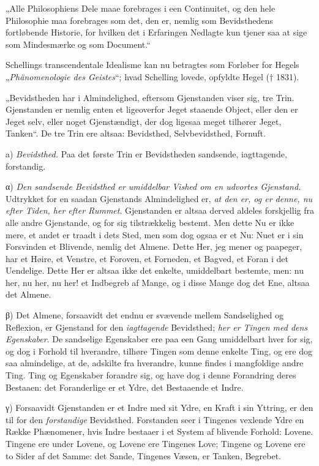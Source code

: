 \documentclass[12pt]{book}
\newcommand{\opage}[1]{\marginnote{\footnotesize\textit{[#1]}}}
\begin{document}
„Alle Philosophiens Dele maae forebrages i een Continuitet, og den hele Philosophie
maa forebrages som det, den er, nemlig som Bevidsthedens fortløbende Historie, for
hvilken det i Erfaringen Nedlagte kun tjener saa at sige som Mindesmærke og som
Document.“

Schellings transcendentale Idealisme kan nu betragtes som Forløber for Hegels
„\textit{Phänomenologie des Geistes}“; hvad Schelling lovede, opfyldte Hegel
(† 1831).

„Bevidstheden har i Almindelighed, eftersom Gjenstanden viser sig, tre Trin.
Gjenstanden er nemlig enten et ligeoverfor Jeget staaende Object, eller den er Jeget
selv, eller noget Gjenstændigt, der dog ligesaa meget tilhører Jeget, Tanken“. De
tre Trin ere altsaa: Bevidsthed, Selvbevidsthed, Fornuft.

a) \emph{Bevidsthed.} Paa det første Trin er Bevidstheden sandsende, iagttagende,
forstandig.

α) \emph{Den sandsende Bevidsthed er umiddelbar Vished om en udvortes Gjenstand.}
Udtrykket for en saadan Gjenstands Almindelighed er, \emph{at den er, og er denne,
nu efter Tiden, her efter Rummet}. Gjenstanden er altsaa derved aldeles forskjellig
fra alle andre Gjenstande, og for sig tilstrækkelig bestemt. Men dette Nu er ikke
mere, et andet er traadt i dets Sted, men som dog ogsaa er et Nu: Nuet
\opage{38} er i sin Forsvinden et Blivende, nemlig det Almene. Dette Her, jeg mener og
paapeger, har et Høire, et Venstre, et Foroven, et Forneden, et Bagved, et Foran i
det Uendelige. Dette Her er altsaa ikke det enkelte, umiddelbart bestemte, men: nu
her, nu her, nu her! et Indbegreb af Mange, og i disse Mange dog det Ene, altsaa det
Almene.

β) Det Almene, forsaavidt det endnu er svævende mellem Sandselighed og Reflexion, er
Gjenstand for den \emph{iagttagende} Bevidsthed; \emph{her er Tingen med dens
Egenskaber}. De sandselige Egenskaber ere paa een Gang umiddelbart hver for sig, og
dog i Forhold til hverandre, tilhøre Tingen som denne enkelte Ting, og ere dog saa
almindelige, at de, adskilte fra hverandre, kunne findes i mangfoldige andre Ting.
Ting og Egenskaber forandre sig, og have dog i denne Forandring deres Bestaaen: det
Foranderlige er et Ydre, det Bestaaende et Indre.

γ) Forsaavidt Gjenstanden er et Indre med sit Ydre, en Kraft i sin Yttring, er den
til for den \emph{forstandige} Bevidsthed. Forstanden seer i Tingenes vexlende Ydre
en Række Phænomener, hvis Indre bestaaer i et System af blivende Forhold: Lovene.
Tingene ere under Lovene, og Lovene ere Tingenes Love; Tingene og Lovene ere to
Sider af det Samme: det Sande, Tingenes Væsen, er Tanken, Begrebet.
\end{document}
